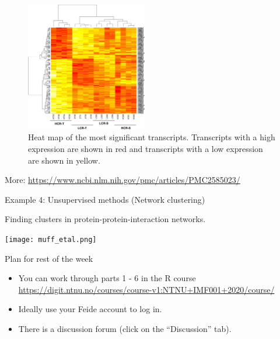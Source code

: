 \documentclass[
  10pt,
  ignorenonframetext,
]{beamer}
\providecommand{\tightlist}{%
  \setlength{\itemsep}{0pt}\setlength{\parskip}{0pt}}
\begin{document}
\begin{frame}
\begin{figure}
\includegraphics[width=150pt]{heatmap} \caption{Heat map of the most significant transcripts. Transcripts with a high expression are shown in red and transcripts with a low expression are shown in yellow.}\label{fig:heatmap_pic}
\end{figure}

\tiny

More: \url{https://www.ncbi.nlm.nih.gov/pmc/articles/PMC2585023/}
\end{frame}

\begin{frame}{Example 4: Unsupervised methods (Network clustering)}
\protect\hypertarget{example-4-unsupervised-methods-network-clustering}{}
\vspace{2mm}

Finding clusters in protein-protein-interaction networks. \vspace{2mm}

\texttt{[image: muff\_etal.png]}
\end{frame}

\begin{frame}{Plan for rest of the week}
\protect\hypertarget{plan-for-rest-of-the-week}{}
\(~\)

\begin{itemize}
\tightlist
\item
  You can work through parts 1 - 6 in the R course
  \url{https://digit.ntnu.no/courses/course-v1:NTNU+IMF001+2020/course/}
\end{itemize}

\vspace{2mm}

\begin{itemize}
\tightlist
\item
  Ideally use your Feide account to log in.
\end{itemize}

\vspace{2mm}

\begin{itemize}
\tightlist
\item
  There is a discussion forum (click on the ``Discussion'' tab).
\end{itemize}
\end{frame}
\end{document}
